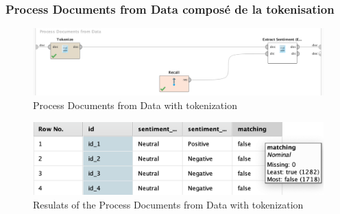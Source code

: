\documentclass[a4paper]{article}
\begin{document}
\subsubsection{Process Documents from Data composé de la tokenisation}
\begin{figure}[H]
	\includegraphics[width=\linewidth]{imgs/part_3/3_processing_documents_no_stem_filter_token_stopword_transform}
	\caption{Process Documents from Data with tokenization}
	\label{fig:3_processing_documents_no_stem_filter_token_stopword_transform}
\end{figure}
\begin{figure}[H]
	\includegraphics[width=\linewidth]{imgs/part_3/3_processing_documents_no_stem_filter_token_stopword_transform_results}
	\caption{Resulats of the Process Documents from Data with tokenization}
	\label{fig:3_processing_documents_no_stem_filter_token_stopword_transform_results}
\end{figure}
\end{document}
